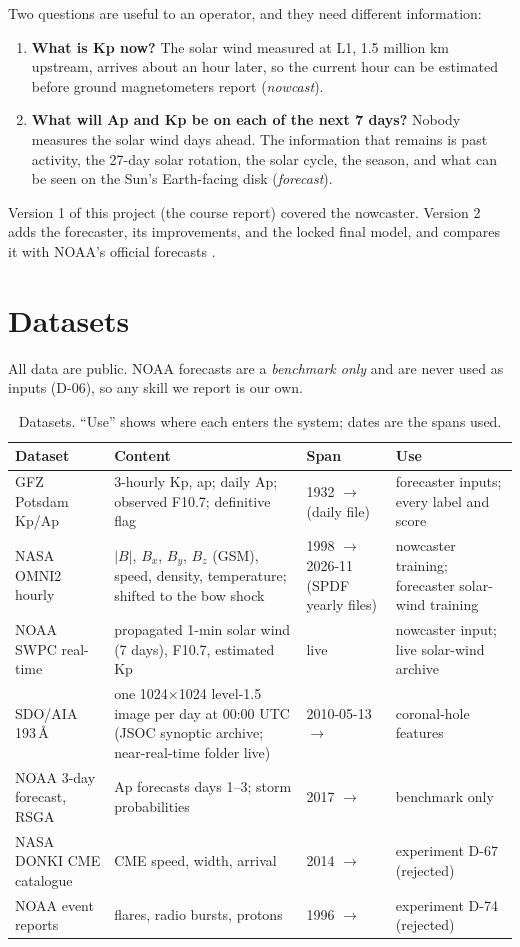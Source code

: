 \documentclass[11pt,a4paper]{article}
\begin{document}
Two questions are useful to an operator, and they need different information:
\begin{enumerate}
\item \textbf{What is Kp now?} The solar wind measured at L1, 1.5 million km upstream, arrives about an hour later,
so the current hour can be estimated before ground magnetometers report (\emph{nowcast}).
\item \textbf{What will Ap and Kp be on each of the next 7 days?} Nobody measures the solar wind days ahead. The
information that remains is past activity, the 27-day solar rotation, the solar cycle, the season, and what can be
seen on the Sun's Earth-facing disk (\emph{forecast}).
\end{enumerate}
Version 1 of this project (the course report) covered the nowcaster. Version 2 adds the forecaster, its
improvements, and the locked final model, and compares it with NOAA's official forecasts \cite{swpc}.

\section{Datasets}
All data are public. NOAA forecasts are a \emph{benchmark only} and are never used as inputs (D-06), so any skill
we report is our own.

\begin{table}[htbp]\centering\small
\caption{Datasets. ``Use'' shows where each enters the system; dates are the spans used.}\label{tab:data}
\begin{tabularx}{\textwidth}{@{}p{3.1cm}Yp{3.3cm}p{2.9cm}@{}}\toprule
Dataset & Content & Span & Use\\\midrule
GFZ Potsdam Kp/Ap \cite{gfzkp} & 3-hourly Kp, ap; daily Ap; observed F10.7; definitive flag & 1932 $\to$ (daily file) & forecaster inputs; every label and score\\
NASA OMNI2 hourly \cite{king2005} & $|B|$, $B_x$, $B_y$, $B_z$ (GSM), speed, density, temperature; shifted to the bow shock & 1998 $\to$ 2026-11 (SPDF yearly files) & nowcaster training; forecaster solar-wind training\\
NOAA SWPC real-time \cite{swpc} & propagated 1-min solar wind (7 days), F10.7, estimated Kp & live & nowcaster input; live solar-wind archive\\
SDO/AIA 193\,\AA{} \cite{lemen2012,pesnell2012} & one 1024$\times$1024 level-1.5 image per day at 00:00 UTC (JSOC synoptic archive; near-real-time folder live) & 2010-05-13 $\to$ & coronal-hole features\\
NOAA 3-day forecast, RSGA \cite{swpc} & Ap forecasts days 1--3; storm probabilities & 2017 $\to$ & benchmark only\\
NASA DONKI CME catalogue & CME speed, width, arrival & 2014 $\to$ & experiment D-67 (rejected)\\
NOAA event reports & flares, radio bursts, protons & 1996 $\to$ & experiment D-74 (rejected)\\\bottomrule
\end{tabularx}
\end{table}
\end{document}
